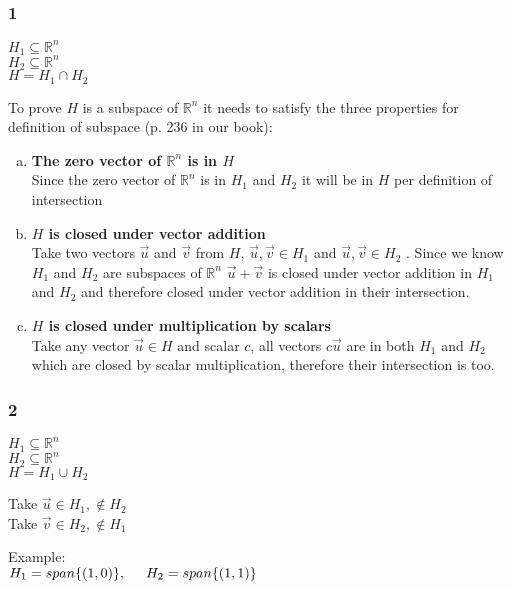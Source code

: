 \documentclass{article}
\begin{document}
\subsubsection*{1}

$H_{1} \subseteq \mathbb{R}^n$\\
$H_{2} \subseteq \mathbb{R}^n$\\
$H = H_{1} \cap H_{2}$

To prove $H$ is a subspace of $\mathbb{R}^n$ it needs to satisfy the three properties for definition of subspace (p. 236 in our book):\\
\begin{enumerate}[(a)]
    \item \textbf{The zero vector of $\mathbb{R}^n$ is in $H$}\\
			 Since the zero vector of $\mathbb{R}^{n}$ is in $H_{1}$ and $H_{2}$ it will be in $H$ per definition of intersection
    \item \textbf{$H$ is closed under vector addition}\\
			Take two vectors $\vec{u}$ and $\vec{v}$ from $H$, $\vec{u},\vec{v} \in H_{1}$ and $\vec{u},\vec{v} \in H_{2}$ . Since we know $H_{1}$ and $H_{2}$ are subspaces of $\mathbb{R}^{n}$ $\vec{u}+\vec{v}$ is closed under vector addition in $H_{1}$ and $H_{2}$ and therefore closed under vector addition in their intersection.
    \item\textbf{ $H$ is closed under multiplication by scalars}\\
			Take any vector $\vec{u} \in H$ and scalar $c$, all vectors $c\vec{u}$ are in both $H_{1}$ and $H_{2}$ which are closed by scalar multiplication, therefore their intersection is too.
\end{enumerate}

\subsubsection*{2}

$H_{1} \subseteq \mathbb{R}^{n}$\\
$H_{2} \subseteq \mathbb{R}^{n}$\\
$H = H_{1} \cup H_{2}$

Take $\vec{u} \in H_{1}, \not \in H_{2}$\\
Take $\vec{v} \in H_{2}, \not \in H_{1}$

Example:\\
$H_{1} = span\{(1,0)\}, \hspace{5 mm}
H_{2} = span\{(1,1)\}
$
\end{document}
